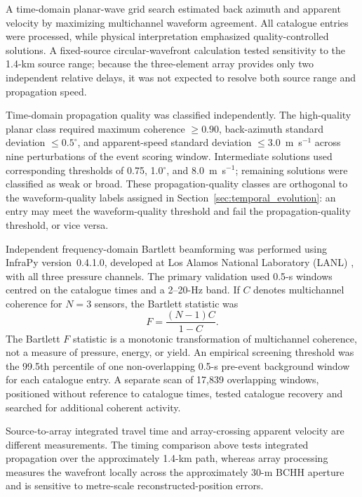 \documentclass[]{seismica}
\begin{document}
A time-domain planar-wave grid search estimated back azimuth and apparent
velocity by maximizing multichannel waveform agreement. All catalogue entries
were processed, while physical interpretation emphasized quality-controlled
solutions. A fixed-source circular-wavefront calculation tested sensitivity to
the 1.4-km source range; because the three-element array provides only two
independent relative delays, it was not expected to resolve both source range
and propagation speed.

Time-domain propagation quality was classified independently. The high-quality
planar class required maximum coherence $\geq0.90$, back-azimuth standard
deviation $\leq0.5^\circ$, and apparent-speed standard deviation
$\leq3.0$~m~s$^{-1}$ across nine perturbations of the event scoring window.
Intermediate solutions used corresponding thresholds of 0.75, 1.0$^\circ$,
and 8.0~m~s$^{-1}$; remaining solutions were classified as weak or broad.
These propagation-quality classes are orthogonal to the waveform-quality labels
assigned in Section~\ref{sec:temporal_evolution}: an entry may meet the
waveform-quality threshold and fail the propagation-quality threshold, or vice
versa.

Independent frequency-domain Bartlett beamforming was performed using InfraPy
version~0.4.1.0, developed at Los Alamos National Laboratory (LANL)
\citep{webster_infrapy_2025}, with all three pressure channels. The primary
validation used 0.5-s windows centred on the catalogue times and a 2--20-Hz
band. If $C$ denotes multichannel coherence for $N=3$ sensors, the Bartlett
statistic was
\begin{equation}
 F=\frac{(N-1)C}{1-C}.
\end{equation}
The Bartlett $F$ statistic is a monotonic transformation of multichannel coherence,
not a measure of pressure, energy, or yield. An empirical screening threshold
was the 99.5th percentile of one non-overlapping 0.5-s pre-event background
window for each catalogue entry. A separate scan of 17,839 overlapping windows,
positioned without reference to catalogue times, tested catalogue recovery and
searched for additional coherent activity.

Source-to-array integrated travel time and array-crossing apparent velocity are
different measurements. The timing comparison above tests integrated
propagation over the approximately 1.4-km path, whereas array processing
measures the wavefront locally across the approximately 30-m BCHH aperture and
is sensitive to metre-scale reconstructed-position errors.
\end{document}
